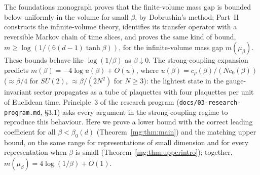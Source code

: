 \documentclass[11pt,a4paper]{article}
\theoremstyle{definition}
\theoremstyle{remark}
\begin{document}
The foundations monograph \cite{F} proves that the finite-volume mass gap is bounded below uniformly in the volume for
small $\beta$, by Dobrushin's method; Part~II \cite{II} constructs the infinite-volume theory, identifies its transfer
operator with a reversible Markov chain of time slices, and proves the same kind of bound,
$m\ge\log(1/(6(d-1)\tanh\beta))$, for the infinite-volume mass gap $m(\mu_\beta)$. These bounds behave like
$\log(1/\beta)$ as $\beta\downarrow0$. The strong-coupling expansion predicts $m(\beta)=-4\log u(\beta)+O(u)$, where
$u(\beta)=c_\rho(\beta)/(Nc_0(\beta))$ ($\approx\beta/4$ for $SU(2)$, $\approx\beta/(2N^2)$ for $N\ge3$): the lightest
state in the gauge-invariant sector propagates as a tube of plaquettes with four plaquettes per unit of Euclidean time.
Principle~3 of the research program (\texttt{docs/03-research-program.md}, \S3.1) asks every argument in the
strong-coupling regime to reproduce this behaviour. Here we prove a lower bound with the correct leading coefficient for all
$\beta<\beta_0(d)$ (Theorem~\ref{mg:thm:main}) and the matching upper bound, on the same range for representations of small dimension
and for every representation when $\beta$ is small (Theorem~\ref{mg:thm:upperintro}); together, $m(\mu_\beta)=4\log(1/\beta)+O(1)$.
\end{document}
